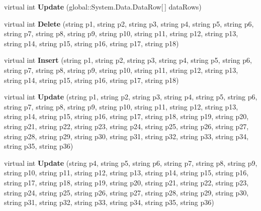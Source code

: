 \begin{DoxyCompactItemize}
\item 
virtual int {\bfseries Update} (global\+::\+System.\+Data.\+Data\+Row\mbox{[}$\,$\mbox{]} data\+Rows)\hypertarget{class_products_1_1_data_1_1ds_sage_table_adapters_1_1ta__cpm___kontakt_email_a2d14b0aac7bd48b28e39a56875e96cd4}{}\label{class_products_1_1_data_1_1ds_sage_table_adapters_1_1ta__cpm___kontakt_email_a2d14b0aac7bd48b28e39a56875e96cd4}

\item 
virtual int {\bfseries Delete} (string p1, string p2, string p3, string p4, string p5, string p6, string p7, string p8, string p9, string p10, string p11, string p12, string p13, string p14, string p15, string p16, string p17, string p18)\hypertarget{class_products_1_1_data_1_1ds_sage_table_adapters_1_1ta__cpm___kontakt_email_a96442ec9f3b51ea6e1cabebdec7ebeb2}{}\label{class_products_1_1_data_1_1ds_sage_table_adapters_1_1ta__cpm___kontakt_email_a96442ec9f3b51ea6e1cabebdec7ebeb2}

\item 
virtual int {\bfseries Insert} (string p1, string p2, string p3, string p4, string p5, string p6, string p7, string p8, string p9, string p10, string p11, string p12, string p13, string p14, string p15, string p16, string p17, string p18)\hypertarget{class_products_1_1_data_1_1ds_sage_table_adapters_1_1ta__cpm___kontakt_email_a0345a2f7c6a80bceabb416b6786fdac3}{}\label{class_products_1_1_data_1_1ds_sage_table_adapters_1_1ta__cpm___kontakt_email_a0345a2f7c6a80bceabb416b6786fdac3}

\item 
virtual int {\bfseries Update} (string p1, string p2, string p3, string p4, string p5, string p6, string p7, string p8, string p9, string p10, string p11, string p12, string p13, string p14, string p15, string p16, string p17, string p18, string p19, string p20, string p21, string p22, string p23, string p24, string p25, string p26, string p27, string p28, string p29, string p30, string p31, string p32, string p33, string p34, string p35, string p36)\hypertarget{class_products_1_1_data_1_1ds_sage_table_adapters_1_1ta__cpm___kontakt_email_a4f658d952b2377461783601ee238e404}{}\label{class_products_1_1_data_1_1ds_sage_table_adapters_1_1ta__cpm___kontakt_email_a4f658d952b2377461783601ee238e404}

\item 
virtual int {\bfseries Update} (string p4, string p5, string p6, string p7, string p8, string p9, string p10, string p11, string p12, string p13, string p14, string p15, string p16, string p17, string p18, string p19, string p20, string p21, string p22, string p23, string p24, string p25, string p26, string p27, string p28, string p29, string p30, string p31, string p32, string p33, string p34, string p35, string p36)\hypertarget{class_products_1_1_data_1_1ds_sage_table_adapters_1_1ta__cpm___kontakt_email_a802865c52cf19c951dae3f0355df7be3}{}\label{class_products_1_1_data_1_1ds_sage_table_adapters_1_1ta__cpm___kontakt_email_a802865c52cf19c951dae3f0355df7be3}

\end{DoxyCompactItemize}
